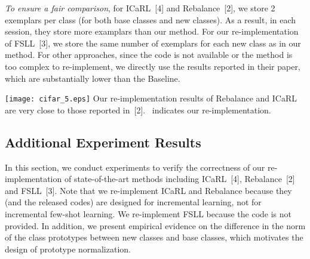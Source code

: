 \documentclass{article}
\begin{document}
\emph{To ensure a fair comparison}, for ICaRL~[4] and Rebalance~[2], we store 2 exemplars per class (for both base classes and new classes). As a result, in each session, they store more examplars than our method. For our re-implementation of FSLL~[3], we store the same number of exemplars for each new class as in our method. For other approaches, since the code is not available or the method is too complex to re-implement, we directly use the results reported in their paper, which are substantially lower than the Baseline. 

\begin{minipage}{.47\textwidth}
    \centering
    \texttt{[image: cifar\_5.eps]}
{Our re-implementation results of Rebalance and ICaRL are very close to those reported in~[2]. \textsuperscript{}~indicates our re-implementation.}
\label{fig:cifar}
\end{minipage}
\hfill
\begin{minipage}{.47\textwidth}
\centering
  \label{table:norm}
\end{minipage}

 
\subsection{Additional Experiment Results} \label{appendix:addition_exp}
In this section, we conduct experiments to verify the correctness of our re-implementation of state-of-the-art methods including ICaRL\textsuperscript{}~[4], Rebalance\textsuperscript{}~[2] and FSLL\textsuperscript{}~[3]. Note that we re-implement ICaRL and Rebalance because they (and the released codes) are designed for incremental learning, not for incremental few-shot learning. We re-implement FSLL because the code is not provided. In addition, we present empirical evidence on the difference in the norm of the class prototypes between new classes and base classes, which motivates the design of prototype normalization. 
\end{document}

